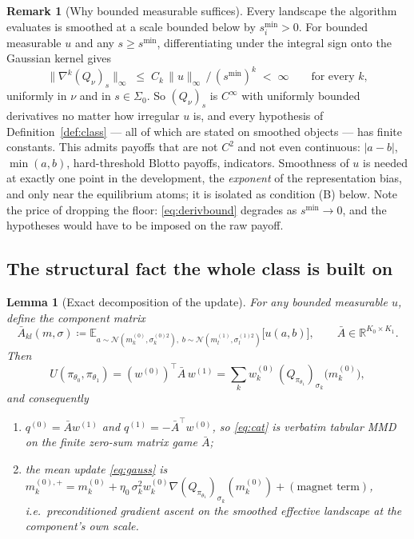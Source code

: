 \documentclass[11pt]{article}
\newtheorem{lemma}{Lemma}
\theoremstyle{definition}
\newtheorem{remark}{Remark}
\newcommand{\R}{\mathbb{R}}
\newcommand{\E}{\mathbb{E}}
\newcommand{\cN}{\mathcal{N}}
\begin{document}
\begin{remark}[Why bounded measurable suffices]\label{rem:reg}
Every landscape the algorithm evaluates is smoothed at a scale bounded below by
$s^{\min}_i > 0$. For bounded measurable $u$ and any $s \ge s^{\min}$,
differentiating under the integral sign onto the Gaussian kernel gives
\begin{equation}\label{eq:derivbound}
  \big\|\nabla^k (Q_\nu)_s\big\|_\infty \;\le\;
  C_k\, \|u\|_\infty \,/\, (s^{\min})^{k} \;<\; \infty
  \qquad \text{for every } k,
\end{equation}
uniformly in $\nu$ and in $s \in \Sigma_0$. So $(Q_\nu)_s$ is $C^\infty$ with
uniformly bounded derivatives no matter how irregular $u$ is, and every
hypothesis of Definition~\ref{def:class} --- all of which are stated on smoothed
objects --- has finite constants. This admits payoffs that are not $C^2$ and not
even continuous: $|a-b|$, $\min(a,b)$, hard-threshold Blotto payoffs, indicators.
Smoothness of $u$ is needed at exactly one point in the development, the
\emph{exponent} of the representation bias, and only near the equilibrium atoms;
it is isolated as condition (B) below. Note the price of dropping the floor:
\eqref{eq:derivbound} degrades as $s^{\min} \to 0$, and the hypotheses would have
to be imposed on the raw payoff.
\end{remark}

\subsection{The structural fact the whole class is built on}
\label{sec:structure}

\begin{lemma}[Exact decomposition of the update]\label{lem:decomp}
For any bounded measurable $u$, define the \emph{component matrix}
\begin{equation}\label{eq:Abar}
  \bar A_{kl}(m,\sigma) \coloneqq
  \E_{a \sim \cN(m^{(0)}_k, \sigma^{(0)2}_k),\; b \sim \cN(m^{(1)}_l, \sigma^{(1)2}_l)}
  \big[u(a,b)\big], \qquad
  \bar A \in \R^{K_0 \times K_1}.
\end{equation}
Then
\begin{equation}
  U(\pi_{\theta_0}, \pi_{\theta_1}) = (w^{(0)})^\top \bar A\, w^{(1)}
  = \sum_k w^{(0)}_k\, (Q_{\pi_{\theta_1}})_{\sigma_k}\!\big(m^{(0)}_k\big),
\end{equation}
and consequently
\begin{enumerate}
\item[(i)] $q^{(0)} = \bar A w^{(1)}$ and $q^{(1)} = -\bar A^\top w^{(0)}$, so
  \eqref{eq:cat} is \emph{verbatim} tabular MMD on the finite zero-sum matrix
  game $\bar A$;
\item[(ii)] the mean update \eqref{eq:gauss} is
  $m^{(0),+}_k = m^{(0)}_k + \eta_0\, \sigma_k^2 w^{(0)}_k
   \nabla (Q_{\pi_{\theta_1}})_{\sigma_k}(m^{(0)}_k) + (\text{magnet term})$,
  i.e.\ preconditioned gradient ascent on the smoothed effective landscape at the
  component's own scale.
\end{enumerate}
\end{lemma}
\end{document}
